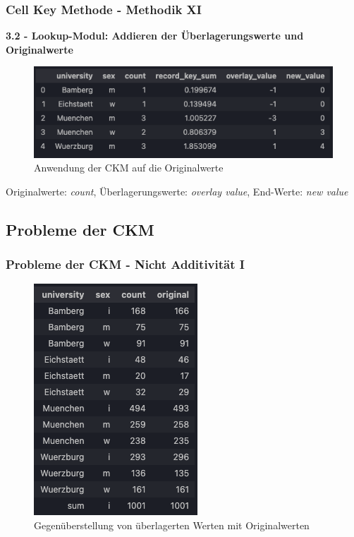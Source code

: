 \documentclass[aspectratio=169]{beamer}
\begin{document}
\begin{frame}{}
	\frametitle{Cell Key Methode - Methodik XI}
    \textbf{3.2 - Lookup-Modul: Addieren der Überlagerungswerte und Originalwerte}
    \begin{figure}
        \includegraphics[width=0.7\linewidth]{img/ckm_5.png}
        \caption{Anwendung der CKM auf die Originalwerte}
    \end{figure}
    Originalwerte: \textit{count}, Überlagerungswerte: \textit{overlay value}, End-Werte: \textit{new value}
\end{frame}


\subsection{Probleme der CKM}

\begin{frame}{}
	\frametitle{Probleme der CKM - Nicht Additivität I}
    \begin{figure}
		\centering
        \includegraphics[width=0.25\linewidth]{img/ckm_6.png}
        \caption{Gegenüberstellung von überlagerten Werten mit Originalwerten}
	\end{figure} 
\end{frame}
\end{document}

